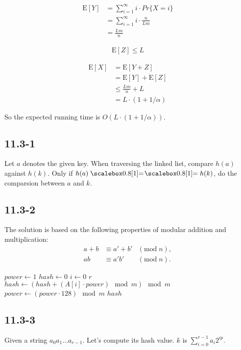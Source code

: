 \documentclass{book}
\begin{document}
\begin{CJK}{UTF8}{gkai}
\begin{align*}
\text{E}[Y] &= \sum_{i=1}^{\infty}i\cdot Pr\{X=i\} \\
& = \sum_{i=1}^{\infty}i\cdot\frac{n}{Lm} \\
& = \frac{Lm}{n}
\end{align*}

\begin{align*}
\text{E}[Z] \le L
\end{align*}

\begin{align*}
\text{E}[X] &= \text{E}[Y+Z] \\
&=\text{E}[Y] + \text{E}[Z] \\
& \le \frac{Lm}{n}+L \\
& = L\cdot(1+1/\alpha)
\end{align*}

So the expected running time is $O(L\cdot(1+1/\alpha))$.

\subsection*{11.3-1}
Let $a$ denotes the given key. When traversing the linked list, compare $h(a)$ 
against $h(k)$. Only if $h(a) \isequal h(k)$, do the comparsion between $a$ and 
$k$.

\subsection*{11.3-2}
The solution is based on the following properties of modular addition and 
multiplication:
\begin{align*}
a + b & \equiv a' + b' & (\mbox{mod}\;n), \\
ab & \equiv a'b' & (\mbox{mod}\;n).
\end{align*}
\begin{codebox}
\li $power \gets 1$
\li $hash \gets 0$
\li \For $i \gets 0$ \To $r$
\li \Do $hash \gets (hash + (A[i] \cdot power) \mod m) \mod m$
\li $power \gets (power \cdot 128) \mod m$
\End
\li \Return $hash$
\end{codebox}

\subsection*{11.3-3}
Given a string $a_0 a_1 \dots a_{r-1}$. Let's compute its hash value. $k$ is 
$\sum_{i=0}^{r-1}a_i 2^{ip}$.


\end{CJK}
\end{document}
